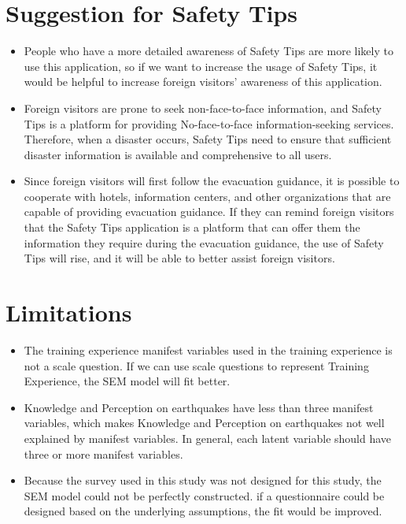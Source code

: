 \section{Suggestion for Safety Tips}
\begin{itemize}
\item People who have a more detailed awareness of Safety Tips are more likely to use this application, so if we want to increase the usage of Safety Tips, it would be helpful to increase foreign visitors' awareness of this application.
\item Foreign visitors are prone to seek non-face-to-face information, and Safety Tips is a platform for providing No-face-to-face information-seeking services. Therefore, when a disaster occurs, Safety Tips need to ensure that sufficient disaster information is available and comprehensive to all users.
\item Since foreign visitors will first follow the evacuation guidance, it is possible to cooperate with hotels, information centers, and other organizations that are capable of providing evacuation guidance. If they can remind foreign visitors that the Safety Tips application is a platform that can offer them the information they require during the evacuation guidance, the use of Safety Tips will rise, and it will be able to better assist foreign visitors.
\end{itemize}

\section{Limitations}
\begin{itemize}
\item The training experience manifest variables used in the training experience is not a scale question. If we can use scale questions to represent Training Experience, the SEM model will fit better.
\item Knowledge and Perception on earthquakes have less than three manifest variables, which makes Knowledge and Perception on earthquakes not well explained by manifest variables. In general, each latent variable should have three or more manifest variables.
\item Because the survey used in this study was not designed for this study, the SEM model could not be perfectly constructed. if a questionnaire could be designed based on the underlying assumptions, the fit would be improved.
\end{itemize}


















